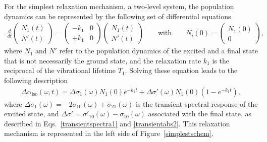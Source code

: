 For the simplest relaxation mechanism, a two-level system, the population dynamics can be represented by the following set of differential equations
\begin{eqnarray}
\frac{d}{d t} \left( \begin{array}{c} N_1 (t) \\ N' (t) \end{array} \right) = \left( \begin{array}{cc} -k_1 & 0 \\ +k_1 & 0 \end{array} \right)  \left( \begin{array}{c} N_1 (t) \\ N' (t) \end{array} \right) \qquad \text{with} \qquad N_i(0) = \left( \begin{array}{c} N_1(0) \\ 0 \end{array} \right),
\label{simplestmodel}
\end{eqnarray}
where $N_1$ and $N'$ refer to the population dynamics of the excited and a final state that is not necessarily the ground state, and the relaxation rate $k_1$ is the reciprocal of the vibrational lifetime $T_1$. Solving these equation leads to the following description
\begin{eqnarray}
\Delta \alpha_{\text{iso}} (\omega, t) = \Delta\sigma_1 (\omega) N_1(0) e^{-k_1 t}  + \Delta\sigma' (\omega) N_1 (0)\left( 1 - e^{-k_1 t} \right),
\end{eqnarray}
where $\Delta \sigma_1 (\omega) = -2 \sigma_{10} (\omega) + \sigma_{21} (\omega)$ is the transient spectral response of the excited state, and $\Delta\sigma' = \sigma'_{10}(\omega) - \sigma_{10} (\omega)$ associated with the final state, as described in Eqs.\ \ref{transientspectra1} and \ref{transientabs2}. This relaxation mechanism is represented in the left side of Figure~\ref{simplestschem}.



